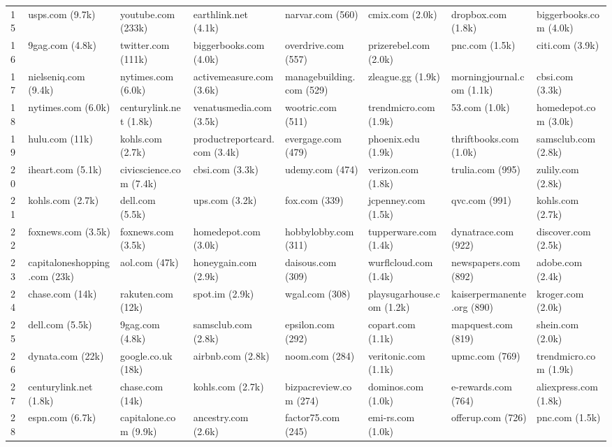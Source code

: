 \documentclass[12pt, letterpaper]{article}
\begin{document}
\begin{table}[ht]
\begin{adjustbox}{max width=\textwidth}
\begin{tabular}{@{\hspace{0\tabcolsep}}llllllll@{\hspace{0\tabcolsep}}}
15 & usps.com (9.7k) & youtube.com (233k) & earthlink.net (4.1k) & narvar.com (560) & cmix.com (2.0k) & dropbox.com (1.8k) & biggerbooks.com (4.0k) \\
16 & 9gag.com (4.8k) & twitter.com (111k) & biggerbooks.com (4.0k) & overdrive.com (557) & prizerebel.com (2.0k) & pnc.com (1.5k) & citi.com (3.9k) \\
17 & nielseniq.com (9.4k) & nytimes.com (6.0k) & activemeasure.com (3.6k) & managebuilding.com (529) & zleague.gg (1.9k) & morningjournal.com (1.1k) & cbsi.com (3.3k) \\
18 & nytimes.com (6.0k) & centurylink.net (1.8k) & venatusmedia.com (3.5k) & wootric.com (511) & trendmicro.com (1.9k) & 53.com (1.0k) & homedepot.com (3.0k) \\
19 & hulu.com (11k) & kohls.com (2.7k) & productreportcard.com (3.4k) & evergage.com (479) & phoenix.edu (1.9k) & thriftbooks.com (1.0k) & samsclub.com (2.8k) \\
20 & iheart.com (5.1k) & civicscience.com (7.4k) & cbsi.com (3.3k) & udemy.com (474) & verizon.com (1.8k) & trulia.com (995) & zulily.com (2.8k) \\
21 & kohls.com (2.7k) & dell.com (5.5k) & ups.com (3.2k) & fox.com (339) & jcpenney.com (1.5k) & qvc.com (991) & kohls.com (2.7k) \\
22 & foxnews.com (3.5k) & foxnews.com (3.5k) & homedepot.com (3.0k) & hobbylobby.com (311) & tupperware.com (1.4k) & dynatrace.com (922) & discover.com (2.5k) \\
23 & capitaloneshopping.com (23k) & aol.com (47k) & honeygain.com (2.9k) & daisous.com (309) & wurflcloud.com (1.4k) & newspapers.com (892) & adobe.com (2.4k) \\
24 & chase.com (14k) & rakuten.com (12k) & spot.im (2.9k) & wgal.com (308) & playsugarhouse.com (1.2k) & kaiserpermanente.org (890) & kroger.com (2.0k) \\
25 & dell.com (5.5k) & 9gag.com (4.8k) & samsclub.com (2.8k) & epsilon.com (292) & copart.com (1.1k) & mapquest.com (819) & shein.com (2.0k) \\
26 & dynata.com (22k) & google.co.uk (18k) & airbnb.com (2.8k) & noom.com (284) & veritonic.com (1.1k) & upmc.com (769) & trendmicro.com (1.9k) \\
27 & centurylink.net (1.8k) & chase.com (14k) & kohls.com (2.7k) & bizpacreview.com (274) & dominos.com (1.0k) & e-rewards.com (764) & aliexpress.com (1.8k) \\
28 & espn.com (6.7k) & capitalone.com (9.9k) & ancestry.com (2.6k) & factor75.com (245) & emi-rs.com (1.0k) & offerup.com (726) & pnc.com (1.5k) \\

\end{tabular}
\end{adjustbox}
\end{table}
\end{document}

